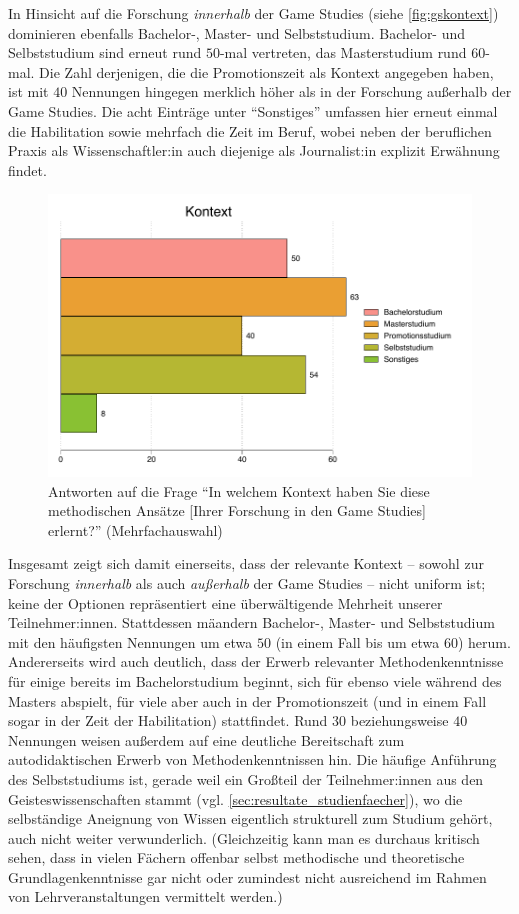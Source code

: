 \documentclass{scrartcl}
\begin{document}
In Hinsicht auf die Forschung \textit{innerhalb} der Game Studies (siehe \autoref{fig:gskontext}) dominieren ebenfalls Bachelor-, Master- und Selbststudium.
Bachelor- und Selbststudium sind erneut rund $50$-mal vertreten, das Masterstudium rund $60$-mal.
Die Zahl derjenigen, die die Promotionszeit als Kontext angegeben haben, ist mit $40$ Nennungen hingegen merklich höher als in der Forschung außerhalb der Game Studies.
Die acht Einträge unter \enquote{Sonstiges} umfassen hier erneut einmal die Habilitation sowie mehrfach die Zeit im Beruf, wobei neben der beruflichen Praxis als Wissenschaftler:in auch diejenige als Journalist:in explizit Erwähnung findet.

\begin{figure}[t]
   \includegraphics[width=1\textwidth]{gskontext.pdf}
   \caption{Antworten auf die Frage \enquote{In welchem Kontext haben Sie diese methodischen Ansätze [Ihrer Forschung in den Game Studies] erlernt?} (Mehrfachauswahl)}
   \label{fig:gskontext}
\end{figure}

Insgesamt zeigt sich damit einerseits, dass der relevante Kontext -- sowohl zur Forschung \textit{innerhalb} als auch \textit{außerhalb} der Game Studies -- nicht uniform ist; keine der Optionen repräsentiert eine überwältigende Mehrheit unserer Teilnehmer:innen.
Stattdessen mäandern Bachelor-, Master- und Selbststudium mit den häufigsten Nennungen um etwa $50$ (in einem Fall bis um etwa $60$) herum.
Andererseits wird auch deutlich, dass der Erwerb relevanter Methodenkenntnisse für einige bereits im Bachelorstudium beginnt, sich für ebenso viele während des Masters abspielt, für viele aber auch in der Promotionszeit (und in einem Fall sogar in der Zeit der Habilitation) stattfindet.
Rund $30$ beziehungsweise $40$ Nennungen weisen außerdem auf eine deutliche Bereitschaft zum autodidaktischen Erwerb von Methodenkenntnissen hin.
Die häufige Anführung des Selbststudiums ist, gerade weil ein Großteil der Teilnehmer:innen aus den Geisteswissenschaften stammt (vgl. \autoref{sec:resultate_studienfaecher}), wo die selbständige Aneignung von Wissen eigentlich strukturell zum Studium gehört, auch nicht weiter verwunderlich.
(Gleichzeitig kann man es durchaus kritisch sehen, dass in vielen Fächern offenbar selbst methodische und theoretische Grundlagenkenntnisse gar nicht oder zumindest nicht ausreichend im Rahmen von Lehrveranstaltungen vermittelt werden.)
\end{document}
